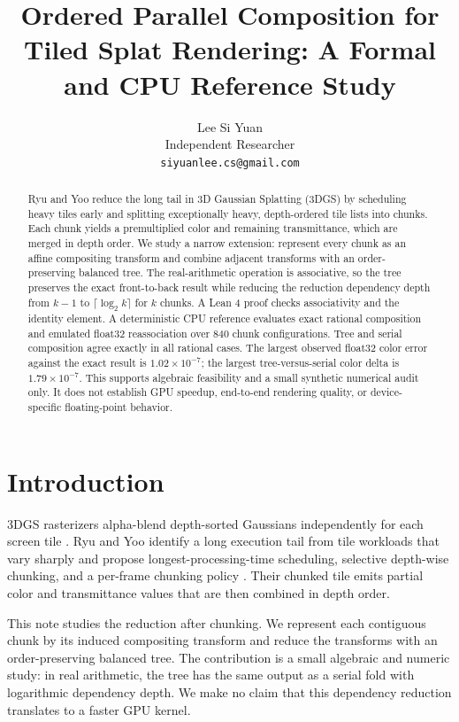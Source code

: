 \documentclass[11pt]{article}
\title{Ordered Parallel Composition for Tiled Splat Rendering: A Formal and CPU Reference Study}
\author{Lee Si Yuan \\
  Independent Researcher \\
  \texttt{siyuanlee.cs@gmail.com}}
\begin{document}
\maketitle
\begin{abstract}
Ryu and Yoo reduce the long tail in 3D Gaussian Splatting (3DGS) by scheduling heavy tiles early and splitting exceptionally heavy, depth-ordered tile lists into chunks. Each chunk yields a premultiplied color and remaining transmittance, which are merged in depth order. We study a narrow extension: represent every chunk as an affine compositing transform and combine adjacent transforms with an order-preserving balanced tree. The real-arithmetic operation is associative, so the tree preserves the exact front-to-back result while reducing the reduction dependency depth from $k-1$ to $\lceil\log_2 k\rceil$ for $k$ chunks. A Lean 4 proof checks associativity and the identity element. A deterministic CPU reference evaluates exact rational composition and emulated float32 reassociation over 840 chunk configurations. Tree and serial composition agree exactly in all rational cases. The largest observed float32 color error against the exact result is $1.02\times 10^{-7}$; the largest tree-versus-serial color delta is $1.79\times 10^{-7}$. This supports algebraic feasibility and a small synthetic numerical audit only. It does not establish GPU speedup, end-to-end rendering quality, or device-specific floating-point behavior.
\end{abstract}

\section{Introduction}
3DGS rasterizers alpha-blend depth-sorted Gaussians independently for each screen tile \citep{kerbl2023}. Ryu and Yoo identify a long execution tail from tile workloads that vary sharply and propose longest-processing-time scheduling, selective depth-wise chunking, and a per-frame chunking policy \citep{ryu2026}. Their chunked tile emits partial color and transmittance values that are then combined in depth order.

This note studies the reduction after chunking. We represent each contiguous chunk by its induced compositing transform and reduce the transforms with an order-preserving balanced tree. The contribution is a small algebraic and numeric study: in real arithmetic, the tree has the same output as a serial fold with logarithmic dependency depth. We make no claim that this dependency reduction translates to a faster GPU kernel.
\end{document}
